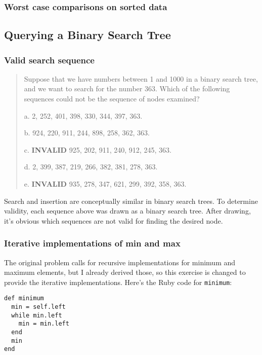 \documentclass{article}
\begin{document}
\subsubsection{Worst case comparisons on sorted data}


\subsection{Querying a Binary Search Tree}

\subsubsection{Valid search sequence}

\begin{quote}
Suppose that we have numbers between 1 and 1000 in a binary search tree, and we
want to search for the number 363. Which of the following sequences could not be
the sequence of nodes examined?

a. 2, 252, 401, 398, 330, 344, 397, 363.

b. 924, 220, 911, 244, 898, 258, 362, 363.

c. \textbf{INVALID} 925, 202, 911, 240, 912, 245, 363.

d. 2, 399, 387, 219, 266, 382, 381, 278, 363.

e. \textbf{INVALID} 935, 278, 347, 621, 299, 392, 358, 363.
\end{quote}

Search and insertion are conceptually similar in binary search
trees. To determine validity, each sequence above was drawn as
a binary search tree. After drawing, it's obvious which sequences
are not valid for finding the desired node.

\subsubsection{Iterative implementations of min and max}

The original problem calls for recursive implementations for minimum
and maximum elements, but I already derived those, so this exercise
is changed to provide the iterative implementations. Here's the
Ruby code for \texttt{minimum}:

\begin{lstlisting}[frame=single]
def minimum
  min = self.left
  while min.left
    min = min.left
  end
  min
end
\end{lstlisting}
\end{document}
